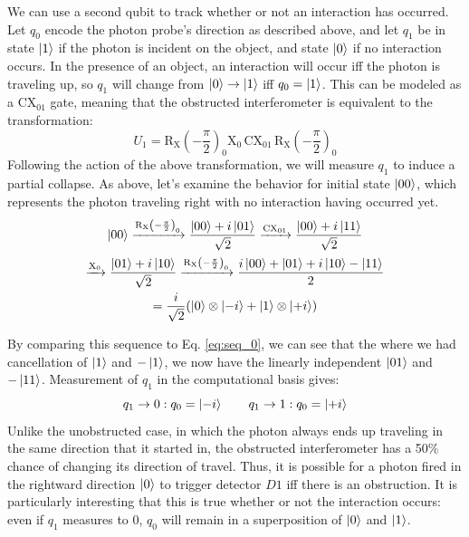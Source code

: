 \documentclass{article}
\newcommand{\X}{\text{X}}
\newcommand{\RX}{\mathrm{R_X}}
\newcommand{\CX}{\text{CX}}
\begin{document}
We can use a second qubit to track whether or not an interaction has occurred. Let $q_0$ encode the photon probe's direction as described above, and let $q_1$ be in state $\ket 1$ if the photon is incident on the object, and state $\ket 0$ if no interaction occurs. In the presence of an object, an interaction will occur iff the photon is traveling up, so $q_1$ will change from $\ket 0 \to \ket 1$ iff $q_0 = \ket 1$. This can be modeled as a $\CX_{01}$ gate, meaning that the obstructed interferometer is equivalent to the transformation:
$$U_1 = \RX\left(-\frac{\pi}{2}\right)_0 \X_0 \, \CX_{01} \, \RX\left(-\frac{\pi}{2}\right)_0$$
Following the action of the above transformation, we will measure $q_1$ to induce a partial collapse. As above, let's examine the behavior for initial state $\ket{00}$, which represents the photon traveling right with no interaction having occurred yet.
\begin{multline} \label{eq:seq_00}
\ket{00} \xrightarrow{\RX\left(-\frac{\pi}{2}\right)_0} \frac{\ket{00} + i\ket{01}}{\sqrt{2}} \xrightarrow{\CX_{01}} \frac{\ket{00} + i\ket{11}}{\sqrt{2}}\\
\xrightarrow{\X_0} \frac{\ket{01} + i\ket{10}}{\sqrt{2}} \xrightarrow{\RX\left(-\frac{\pi}{2}\right)_0} \frac{i\ket{00} + \ket{01} + i\ket{10} - \ket{11}}{2}\\
= \frac{i}{\sqrt{2}}(\ket0 \otimes \ket{-i} + \ket1 \otimes \ket{+i})
\end{multline}

By comparing this sequence to Eq. \ref{eq:seq_0}, we can see that the where we had cancellation of $\ket 1$ and $-\ket 1$, we now have the linearly independent $\ket{01}$ and $-\ket{11}$. Measurement of $q_1$ in the computational basis gives:
$$q_1 \to 0: q_0 = \ket{-i} \qquad q_1 \to 1: q_0 = \ket{+i}$$
Unlike the unobstructed case, in which the photon always ends up traveling in the same direction that it started in, the obstructed interferometer has a 50\% chance of changing its direction of travel. Thus, it is possible for a photon fired in the rightward direction $\ket 0$ to trigger detector $D1$ iff there is an obstruction. It is particularly interesting that this is true whether or not the interaction occurs: even if $q_1$ measures to 0, $q_0$ will remain in a superposition of $\ket 0$ and $\ket 1$.
\end{document}
